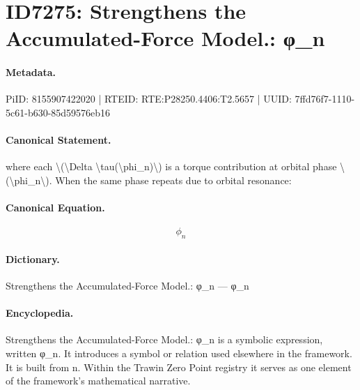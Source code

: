 \section*{ID7275: Strengthens the Accumulated-Force Model.: φ\_n}
\paragraph{Metadata.}
PiID: 8155907422020 | RTEID: RTE:P28250.4406:T2.5657 | UUID: 7ffd76f7-1110-5c61-b630-85d59576eb16

\paragraph{Canonical Statement.}
where each \textbackslash{}(\textbackslash{}Delta \textbackslash{}tau(\textbackslash{}phi\_n)\textbackslash{}) is a torque contribution at orbital phase \textbackslash{}(\textbackslash{}phi\_n\textbackslash{}). When the same phase repeats due to orbital resonance:

\paragraph{Canonical Equation.}
\[
\phi_n
\]

\paragraph{Dictionary.}
Strengthens the Accumulated-Force Model.: φ\_n — φ\_n

\paragraph{Encyclopedia.}
Strengthens the Accumulated-Force Model.: φ\_n is a symbolic expression, written φ\_n. It introduces a symbol or relation used elsewhere in the framework. It is built from n. Within the Trawin Zero Point registry it serves as one element of the framework's mathematical narrative.
